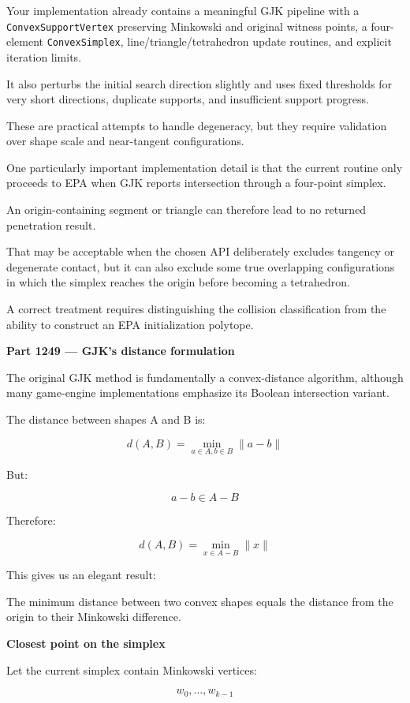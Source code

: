Your implementation already contains a meaningful GJK pipeline with a \texttt{ConvexSupportVertex} preserving Minkowski and original witness points, a four-element \texttt{ConvexSimplex}, line/triangle/tetrahedron update routines, and explicit iteration limits.

It also perturbs the initial search direction slightly and uses fixed thresholds for very short directions, duplicate supports, and insufficient support progress.

These are practical attempts to handle degeneracy, but they require validation over shape scale and near-tangent configurations.

One particularly important implementation detail is that the current routine only proceeds to EPA when GJK reports intersection through a four-point simplex.

An origin-containing segment or triangle can therefore lead to no returned penetration result.

That may be acceptable when the chosen API deliberately excludes tangency or degenerate contact, but it can also exclude some true overlapping configurations in which the simplex reaches the origin before becoming a tetrahedron.

A correct treatment requires distinguishing the collision classification from the ability to construct an EPA initialization polytope.

\textbf{Part 1249 --- GJK's distance formulation}

The original GJK method is fundamentally a convex-distance algorithm, although many game-engine implementations emphasize its Boolean intersection variant.

The distance between shapes A and B is:

\[
\boxed{ d(A,B)= \min_{a\in A,b\in B}\|a-b\| }
\]

But:

\[
a-b\in A-B
\]

Therefore:

\[
\boxed{ d(A,B)= \min_{x\in A-B}\|x\| }
\]

This gives us an elegant result:

The minimum distance between two convex shapes equals the distance from the origin to their Minkowski difference.

\textbf{Closest point on the simplex}

Let the current simplex contain Minkowski vertices:

\[
w_0,\ldots,w_{k-1}
\]

